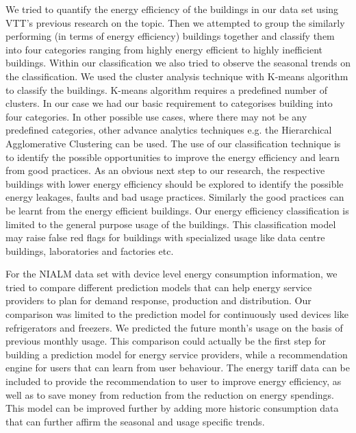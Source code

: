 We tried to quantify the energy efficiency of the buildings in our data set using VTT's previous research on the topic. Then we attempted to group the similarly performing (in terms of energy efficiency) buildings together and classify them into four categories ranging from highly energy efficient to highly inefficient buildings. Within our classification we also tried to observe the seasonal trends on the classification. We used the cluster analysis technique with K-means algorithm to classify the buildings. K-means algorithm requires a predefined number of clusters. In our case we had our basic requirement to categorises building into four categories. In other possible use cases, where there may not be any predefined categories, other advance analytics techniques e.g. the Hierarchical Agglomerative Clustering can be used. The use of our classification technique is to identify the possible opportunities to improve the energy efficiency and learn from good practices. As an obvious next step to our research, the respective buildings with lower energy efficiency should be explored to identify the possible energy leakages, faults and bad usage practices. Similarly the good practices can be learnt from the energy efficient buildings. Our energy efficiency classification is limited to the general purpose usage of the buildings. This classification model may raise false red flags for buildings with specialized usage like data centre buildings, laboratories and factories etc. 

For the NIALM data set with device level energy consumption information, we tried to compare different prediction models that can help energy service providers to plan for demand response, production and distribution. Our comparison was limited to the prediction model for continuously used devices like refrigerators and freezers. We predicted the future month's usage on the basis of previous monthly usage. This comparison could actually be the first step for building a prediction model for energy service providers, while a recommendation engine for users that can learn from user behaviour. The energy tariff data can be included to provide the recommendation to user to improve energy efficiency, as well as to save money from reduction from the reduction on energy spendings. This model can be improved further by adding more historic consumption data that can further affirm the seasonal and usage specific trends.    